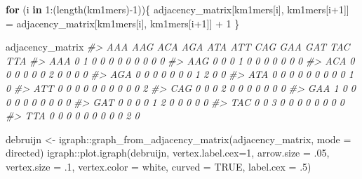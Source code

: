 \documentclass[
]{book}
\newenvironment{Shaded}{\begin{snugshade}}{\end{snugshade}}
\newcommand{\AttributeTok}[1]{\textcolor[rgb]{0.77,0.63,0.00}{#1}}
\newcommand{\CommentTok}[1]{\textcolor[rgb]{0.56,0.35,0.01}{\textit{#1}}}
\newcommand{\ConstantTok}[1]{\textcolor[rgb]{0.00,0.00,0.00}{#1}}
\newcommand{\ControlFlowTok}[1]{\textcolor[rgb]{0.13,0.29,0.53}{\textbf{#1}}}
\newcommand{\DecValTok}[1]{\textcolor[rgb]{0.00,0.00,0.81}{#1}}
\newcommand{\FunctionTok}[1]{\textcolor[rgb]{0.00,0.00,0.00}{#1}}
\newcommand{\NormalTok}[1]{#1}
\newcommand{\OtherTok}[1]{\textcolor[rgb]{0.56,0.35,0.01}{#1}}
\newcommand{\SpecialCharTok}[1]{\textcolor[rgb]{0.00,0.00,0.00}{#1}}
\newcommand{\StringTok}[1]{\textcolor[rgb]{0.31,0.60,0.02}{#1}}
\begin{document}
\begin{Shaded}
\begin{Highlighting}[]
\ControlFlowTok{for}\NormalTok{ (i }\ControlFlowTok{in} \DecValTok{1}\SpecialCharTok{:}\NormalTok{(}\FunctionTok{length}\NormalTok{(km1mers)}\SpecialCharTok{{-}}\DecValTok{1}\NormalTok{))\{}
\NormalTok{  adjacency\_matrix[km1mers[i], km1mers[i}\SpecialCharTok{+}\DecValTok{1}\NormalTok{]] }\OtherTok{=}\NormalTok{ adjacency\_matrix[km1mers[i], km1mers[i}\SpecialCharTok{+}\DecValTok{1}\NormalTok{]] }\SpecialCharTok{+} \DecValTok{1}
\NormalTok{\}}

\NormalTok{adjacency\_matrix}
\CommentTok{\#\textgreater{}     AAA AAG ACA AGA ATA ATT CAG GAA GAT TAC TTA}
\CommentTok{\#\textgreater{} AAA   0   1   0   0   0   0   0   0   0   0   0}
\CommentTok{\#\textgreater{} AAG   0   0   0   1   0   0   0   0   0   0   0}
\CommentTok{\#\textgreater{} ACA   0   0   0   0   0   0   2   0   0   0   0}
\CommentTok{\#\textgreater{} AGA   0   0   0   0   0   0   0   1   2   0   0}
\CommentTok{\#\textgreater{} ATA   0   0   0   0   0   0   0   0   0   1   0}
\CommentTok{\#\textgreater{} ATT   0   0   0   0   0   0   0   0   0   0   2}
\CommentTok{\#\textgreater{} CAG   0   0   0   2   0   0   0   0   0   0   0}
\CommentTok{\#\textgreater{} GAA   1   0   0   0   0   0   0   0   0   0   0}
\CommentTok{\#\textgreater{} GAT   0   0   0   0   1   2   0   0   0   0   0}
\CommentTok{\#\textgreater{} TAC   0   0   3   0   0   0   0   0   0   0   0}
\CommentTok{\#\textgreater{} TTA   0   0   0   0   0   0   0   0   0   2   0}
\end{Highlighting}
\end{Shaded}

\begin{Shaded}
\begin{Highlighting}[]
\NormalTok{debruijn }\OtherTok{\textless{}{-}}\NormalTok{ igraph}\SpecialCharTok{::}\FunctionTok{graph\_from\_adjacency\_matrix}\NormalTok{(adjacency\_matrix, }\AttributeTok{mode =} \StringTok{\textquotesingle{}directed\textquotesingle{}}\NormalTok{)}
\NormalTok{igraph}\SpecialCharTok{::}\FunctionTok{plot.igraph}\NormalTok{(debruijn, }\AttributeTok{vertex.label.cex=}\DecValTok{1}\NormalTok{, }\AttributeTok{arrow.size =}\NormalTok{ .}\DecValTok{05}\NormalTok{,}
     \AttributeTok{vertex.size =}\NormalTok{ .}\DecValTok{1}\NormalTok{, }\AttributeTok{vertex.color =} \StringTok{\textquotesingle{}white\textquotesingle{}}\NormalTok{,}
     \AttributeTok{curved =} \ConstantTok{TRUE}\NormalTok{, }\AttributeTok{label.cex =}\NormalTok{ .}\DecValTok{5}\NormalTok{)}
\end{Highlighting}
\end{Shaded}
\end{document}
